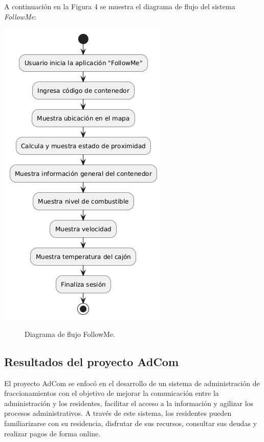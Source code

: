 \documentclass[protocolo.tex]{subfiles}
\begin{document}
A continuación en la Figura 4 se muestra el diagrama de flujo del sistema \textit{FollowMe}:\vspace{4mm}
\begin{center}
\includegraphics[scale=0.6]{Imagenes/Pdf/followmeF.png}
\end{center}
\begin{figure}[h]  %
    \centering
    \caption{Diagrama de flujo FollowMe.}
    \label{fig:mi-figura4}
\end{figure}
\subsection{Resultados del proyecto AdCom}

El proyecto AdCom se enfocó en el desarrollo de un sistema de administración de fraccionamientos con el objetivo de  mejorar la comunicación entre la administración y los residentes,  facilitar el acceso a la información y agilizar los procesos administrativos.  A través de este sistema, los residentes pueden  familiarizarse con su residencia,  disfrutar de sus recursos,  consultar sus deudas y realizar pagos de forma online.\vspace{4mm}
\end{document}
